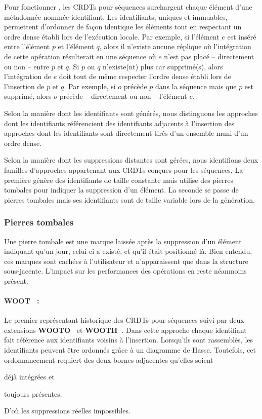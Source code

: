 Pour fonctionner , les CRDTs pour séquences surchargent chaque élément d'une
métadonnée nommée identifiant. Les identifiants, uniques et immuables,
permettent d'ordonner de façon identique les éléments tout en respectant un
ordre dense établi lors de l'exécution locale. Par exemple, si l'élément $e$ est
inséré entre l'élément $p$ et l'élément $q$, alors il n'existe aucune réplique
où l'intégration de cette opération résulterait en une séquence où $e$ n'est pas
placé -- directement ou non -- entre $p$ et $q$.  Si $p$ ou $q$ n'existe(nt)
plus car supprimé(s), alors l'intégration de $e$ doit tout de même respecter
l'ordre dense établi lors de l'insertion de $p$ et $q$. Par exemple, si $o$
précède $p$ dans la séquence mais que $p$ est supprimé, alors $o$ précède --
directement ou non -- l'élément $e$.

Selon la manière dont les identifiants sont générés, nous distinguons les
approches dont les identifiants référencient des identifiants adjacents à
l'insertion des approches dont les identifiants sont directement tirés d'un
ensemble muni d'un ordre dense.

Selon la manière dont les suppressions distantes sont gérées, nous identifions
deux familles d'approches appartenant aux CRDTs conçues pour les séquences. La
première génère des identifiants de taille constante mais utilise des pierres
tombales pour indiquer la suppression d'un élément. La seconde se passe de
pierres tombales mais ses identifiants sont de taille variable lors de la
génération.

\subsubsection{Pierres tombales}

Une pierre tombale est une marque laissée après la suppression d'un élément
indiquant qu'un jour, celui-ci a existé, et qu'il était positionné là. Bien
entendu, ces marques sont cachées à l'utilisateur et n'apparaissent que dans la
structure sous-jacente. L'impact sur les performances des opérations en reste
néanmoins présent.

\paragraph{WOOT~\cite{oster2006data} :} Le premier représentant historique des
CRDTs pour séquences suivi par deux extensions
\textbf{WOOTO~\cite{weiss2007wooki}} et
\textbf{WOOTH~\cite{ahmed2011evaluating}}. Dans cette approche chaque
identifiant fait référence aux identifiants voisins à l'insertion.  Lorsqu'ils
sont rassemblés, les identifiants peuvent être ordonnés grâce à un diagramme de
Hasse. Toutefois, cet ordonnancement requiert des deux bornes adjacentes
qu'elles soient
\begin{inparaenum}[(i)]
\item déjà intégrées et
\item toujours présentes.
\end{inparaenum}
D'où les suppressions réelles impossibles.

